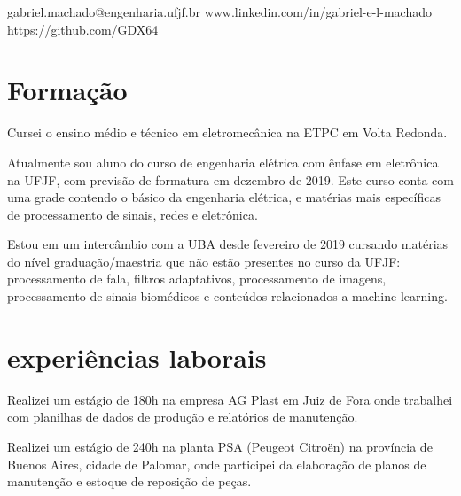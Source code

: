 \documentclass{my_cv}
\begin{document}
	
	
	
	 \hfill {}
	
	\begin{multicols}{2}
		
	{gabriel.machado@engenharia.ufjf.br}
	{www.linkedin.com/in/gabriel-e-l-machado}
	{https://github.com/GDX64}
		
	\section{Formação}
	\justify
	Cursei o ensino médio e técnico em eletromecânica na ETPC em Volta Redonda.
	
	Atualmente sou aluno do curso de engenharia elétrica com ênfase em eletrônica na UFJF, com previsão de formatura em dezembro de 2019. Este curso conta com uma grade contendo o básico da engenharia elétrica, e matérias mais específicas de processamento de sinais, redes e eletrônica.
	
	Estou em um intercâmbio com a UBA desde fevereiro de 2019 cursando matérias do nível graduação/maestria que não estão presentes no curso da UFJF: processamento de fala, filtros adaptativos, processamento de imagens, processamento de sinais biomédicos e conteúdos relacionados a machine learning.
	
	\section{experiências laborais}
	Realizei um estágio de 180h na empresa AG Plast em Juiz de Fora onde trabalhei com planilhas de dados de produção e relatórios de manutenção.
	
	Realizei um estágio de 240h na planta PSA (Peugeot Citroën) na província de Buenos Aires, cidade de Palomar, onde participei da elaboração de planos de manutenção e estoque de reposição de peças.
	

\end{multicols}
\end{document}
